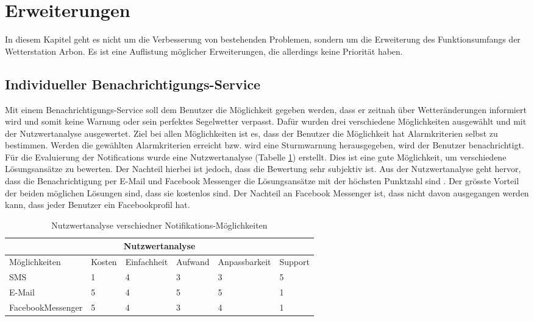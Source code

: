 \section{Erweiterungen}
In diesem Kapitel geht es nicht um die Verbesserung von bestehenden Problemen, sondern um die Erweiterung des Funktionsumfangs der Wetterstation Arbon. Es ist eine Auflistung möglicher Erweiterungen, die allerdings keine Priorität haben.


\subsection{Individueller Benachrichtigungs-Service}
Mit einem Benachrichtigungs-Service soll dem Benutzer die Möglichkeit gegeben werden, dass er zeitnah über Wetteränderungen informiert wird und somit keine Warnung oder sein perfektes Segelwetter verpasst. Dafür wurden drei verschiedene Möglichkeiten ausgewählt und mit der Nutzwertanalyse ausgewertet. Ziel bei allen Möglichkeiten ist es, dass der Benutzer die Möglichkeit hat Alarmkriterien selbst zu bestimmen. Werden die gewählten Alarmkriterien erreicht bzw. wird eine Sturmwarnung herausgegeben, wird der Benutzer benachrichtigt. Für die Evaluierung der Notifications wurde eine Nutzwertanalyse (Tabelle \ref{table:nutzwertanalyse}) erstellt. Dies ist eine gute Möglichkeit, um verschiedene Lösungsansätze zu bewerten. Der Nachteil hierbei ist jedoch, dass die Bewertung sehr subjektiv ist. Aus der Nutzwertanalyse geht hervor, dass die Benachrichtigung per E-Mail und Facebook Messenger die Lösungsansätze mit der höchsten Punktzahl sind . Der grösste Vorteil der beiden möglichen Lösungen sind, dass sie kostenlos sind. Der Nachteil an Facebook Messenger ist, dass nicht davon ausgegangen werden kann, dass jeder Benutzer ein Facebookprofil hat. 

\begin{table}
\begin{center}
\begin{tabular}{ |p{3.5cm}||p{1.1cm}|p{2cm}|p{1.7cm}|p{2.3cm}|p{1.4cm}|}
 \hline
 \multicolumn{6}{|c|}{Nutzwertanalyse} \\
 \hline
	Möglichkeiten & Kosten & Einfachheit & Aufwand & Anpassbarkeit & Support\\
 \hline
	SMS & 1 & 4 & 3 & 3 & 5\\
	E-Mail & 5 & 4 & 5 & 5 & 1\\
	FacebookMessenger & 5 & 4 & 3 & 4 & 1\\
 
\hline
\end{tabular}
\end{center}
\caption{Nutzwertanalyse verschiedner Notifikations-Möglichkeiten}
\label{table:nutzwertanalyse}
\end{table}



